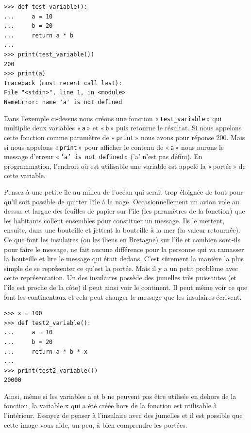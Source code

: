 \begin{Verbatim}[frame=single,rulecolor=\color{red}, label=erreur]
>>> def test_variable():
...     a = 10
...     b = 20
...     return a * b
...
>>> print(test_variable())
200
>>> print(a)
Traceback (most recent call last):
File "<stdin>", line 1, in <module>
NameError: name 'a' is not defined
\end{Verbatim}

Dans l'exemple ci-dessus nous créons une fonction « \texttt{test\_variable} » qui multiplie deux variables « \texttt{a} » et « \texttt{b} » puis retourne le résultat. Si nous appelons cette fonction comme paramètre de « \texttt{print} »  nous avons pour réponse 200. Mais si nous appelons « \texttt{print} » pour afficher le contenu de « \texttt{a} » nous aurons  le message d'erreur « \texttt{'a' is not defined} » ('a' n'est pas défini). En programmation, l'endroit où est utilisable une variable est appelé la « portée » de cette variable.

Pensez à une petite île au milieu de l'océan qui serait trop éloignée de tout pour qu'il soit possible de quitter l'île à la nage. Occasionnellement un avion vole au dessus et largue des feuilles de papier sur l'île (les paramètres de la fonction) que les habitants collent ensembles pour constituer un message. Ils le mettent, ensuite, dans une bouteille et jettent la bouteille à la mer (la valeur retournée). Ce que font les insulaires (ou les îliens en Bretagne) sur l'île et combien sont-ils pour faire le message, ne fait aucune différence pour la personne qui va ramasser la bouteille et lire le message qui était dedans. C'est sûrement la manière la plus simple de se représenter ce qu'est la portée. Mais il y a un petit problème avec cette représentation. Un des insulaires possède des jumelles très puissantes (et l'île est proche de la côte) il peut ainsi voir le continent. Il peut même voir ce que font les continentaux et cela peut changer le message que les insulaires écrivent.

 \begin{Verbatim}[frame=single,rulecolor=\color{mbleu}, label=à taper]
>>> x = 100
>>> def test2_variable():
...     a = 10
...     b = 20
...     return a * b * x
...
>>> print(test2_variable())
20000
\end{Verbatim}

Ainsi, même si les variables a et b ne peuvent pas être utilisée en dehors de la fonction, la variable x qui a été créée hors de la fonction est utilisable à l'intérieur. Essayez de penser à l'insulaire avec des jumelles et il est possible que cette image vous aide, un peu, à bien comprendre les portées. 

